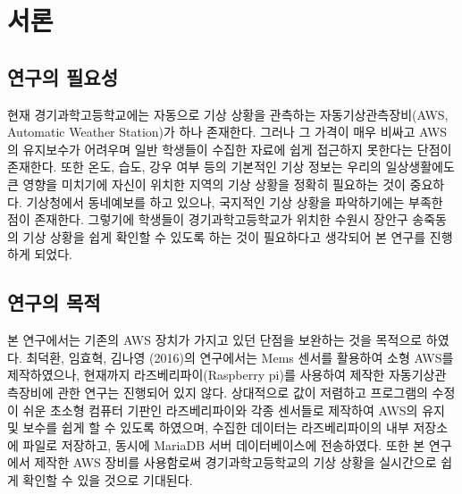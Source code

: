 \section{서론}

\subsection{연구의 필요성}

현재 경기과학고등학교에는 자동으로 기상 상황을 관측하는 자동기상관측장비(AWS, Automatic Weather Station)가 하나 존재한다. 그러나 그 가격이 매우 비싸고 AWS의 유지보수가 어려우며 일반 학생들이 수집한 자료에 쉽게 접근하지 못한다는 단점이 존재한다. 또한 온도, 습도, 강우 여부 등의 기본적인 기상 정보는 우리의 일상생활에도 큰 영향을 미치기에 자신이 위치한 지역의 기상 상황을 정확히 필요하는 것이 중요하다. 기상청에서 동네예보를 하고 있으나,  국지적인 기상 상황을 파악하기에는 부족한 점이 존재한다. 그렇기에 학생들이 경기과학고등학교가 위치한 수원시 장안구 송죽동의 기상 상황을 쉽게 확인할 수 있도록 하는 것이 필요하다고 생각되어 본 연구를 진행하게 되었다.

\subsection{연구의 목적}
본 연구에서는 기존의 AWS 장치가 가지고 있던 단점을 보완하는 것을 목적으로 하였다. 최덕환, 임효혁, 김나영 (2016)의 연구에서는 Mems 센서를 활용하여 소형 AWS를 제작하였으나, 현재까지 라즈베리파이(Raspberry pi)를 사용하여 제작한 자동기상관측장비에 관한 연구는 진행되어 있지 않다.\cite{Ref1} 상대적으로 값이 저렴하고 프로그램의 수정이 쉬운 초소형 컴퓨터 기판인 라즈베리파이와 각종 센서들로 제작하여 AWS의 유지 및 보수를 쉽게 할 수 있도록 하였으며, 수집한 데이터는 라즈베리파이의 내부 저장소에 파일로 저장하고, 동시에 MariaDB 서버 데이터베이스에 전송하였다. 또한 본 연구에서 제작한 AWS 장비를 사용함로써 경기과학고등학교의 기상 상황을 실시간으로 쉽게 확인할 수 있을 것으로 기대된다.